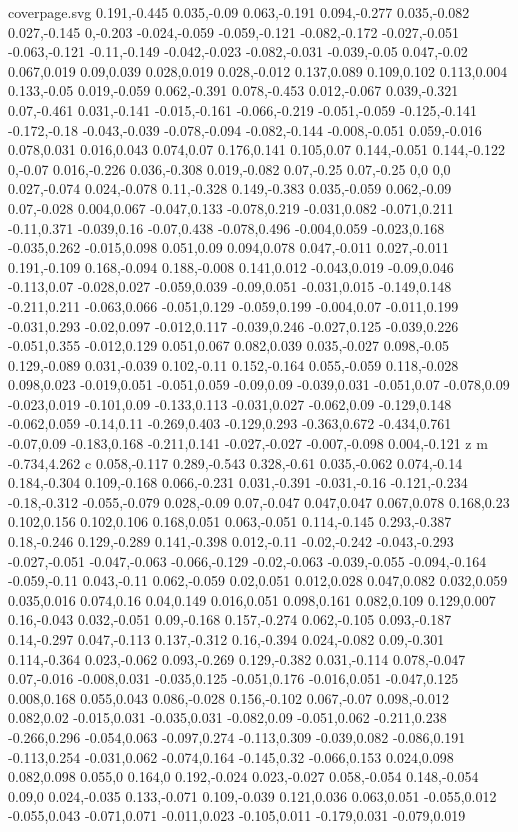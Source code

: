 \begin{filecontents}[noheader]{coverpage.svg}
0.191,-0.445 0.035,-0.09 0.063,-0.191 0.094,-0.277 0.035,-0.082 0.027,-0.145 0,-0.203 -0.024,-0.059 -0.059,-0.121 -0.082,-0.172 -0.027,-0.051 -0.063,-0.121 -0.11,-0.149 -0.042,-0.023 -0.082,-0.031 -0.039,-0.05 0.047,-0.02 0.067,0.019 0.09,0.039 0.028,0.019 0.028,-0.012 0.137,0.089 0.109,0.102 0.113,0.004 0.133,-0.05 0.019,-0.059 0.062,-0.391 0.078,-0.453 0.012,-0.067 0.039,-0.321 0.07,-0.461 0.031,-0.141 -0.015,-0.161 -0.066,-0.219 -0.051,-0.059 -0.125,-0.141 -0.172,-0.18 -0.043,-0.039 -0.078,-0.094 -0.082,-0.144 -0.008,-0.051 0.059,-0.016 0.078,0.031 0.016,0.043 0.074,0.07 0.176,0.141 0.105,0.07 0.144,-0.051 0.144,-0.122 0,-0.07 0.016,-0.226 0.036,-0.308 0.019,-0.082 0.07,-0.25 0.07,-0.25 0,0 0,0 0.027,-0.074 0.024,-0.078 0.11,-0.328 0.149,-0.383 0.035,-0.059 0.062,-0.09 0.07,-0.028 0.004,0.067 -0.047,0.133 -0.078,0.219 -0.031,0.082 -0.071,0.211 -0.11,0.371 -0.039,0.16 -0.07,0.438 -0.078,0.496 -0.004,0.059 -0.023,0.168 -0.035,0.262 -0.015,0.098 0.051,0.09 0.094,0.078 0.047,-0.011 0.027,-0.011 0.191,-0.109 0.168,-0.094 0.188,-0.008 0.141,0.012 -0.043,0.019 -0.09,0.046 -0.113,0.07 -0.028,0.027 -0.059,0.039 -0.09,0.051 -0.031,0.015 -0.149,0.148 -0.211,0.211 -0.063,0.066 -0.051,0.129 -0.059,0.199 -0.004,0.07 -0.011,0.199 -0.031,0.293 -0.02,0.097 -0.012,0.117 -0.039,0.246 -0.027,0.125 -0.039,0.226 -0.051,0.355 -0.012,0.129 0.051,0.067 0.082,0.039 0.035,-0.027 0.098,-0.05 0.129,-0.089 0.031,-0.039 0.102,-0.11 0.152,-0.164 0.055,-0.059 0.118,-0.028 0.098,0.023 -0.019,0.051 -0.051,0.059 -0.09,0.09 -0.039,0.031 -0.051,0.07 -0.078,0.09 -0.023,0.019 -0.101,0.09 -0.133,0.113 -0.031,0.027 -0.062,0.09 -0.129,0.148 -0.062,0.059 -0.14,0.11 -0.269,0.403 -0.129,0.293 -0.363,0.672 -0.434,0.761 -0.07,0.09 -0.183,0.168 -0.211,0.141 -0.027,-0.027 -0.007,-0.098 0.004,-0.121 z m -0.734,4.262 c 0.058,-0.117 0.289,-0.543 0.328,-0.61 0.035,-0.062 0.074,-0.14 0.184,-0.304 0.109,-0.168 0.066,-0.231 0.031,-0.391 -0.031,-0.16 -0.121,-0.234 -0.18,-0.312 -0.055,-0.079 0.028,-0.09 0.07,-0.047 0.047,0.047 0.067,0.078 0.168,0.23 0.102,0.156 0.102,0.106 0.168,0.051 0.063,-0.051 0.114,-0.145 0.293,-0.387 0.18,-0.246 0.129,-0.289 0.141,-0.398 0.012,-0.11 -0.02,-0.242 -0.043,-0.293 -0.027,-0.051 -0.047,-0.063 -0.066,-0.129 -0.02,-0.063 -0.039,-0.055 -0.094,-0.164 -0.059,-0.11 0.043,-0.11 0.062,-0.059 0.02,0.051 0.012,0.028 0.047,0.082 0.032,0.059 0.035,0.016 0.074,0.16 0.04,0.149 0.016,0.051 0.098,0.161 0.082,0.109 0.129,0.007 0.16,-0.043 0.032,-0.051 0.09,-0.168 0.157,-0.274 0.062,-0.105 0.093,-0.187 0.14,-0.297 0.047,-0.113 0.137,-0.312 0.16,-0.394 0.024,-0.082 0.09,-0.301 0.114,-0.364 0.023,-0.062 0.093,-0.269 0.129,-0.382 0.031,-0.114 0.078,-0.047 0.07,-0.016 -0.008,0.031 -0.035,0.125 -0.051,0.176 -0.016,0.051 -0.047,0.125 0.008,0.168 0.055,0.043 0.086,-0.028 0.156,-0.102 0.067,-0.07 0.098,-0.012 0.082,0.02 -0.015,0.031 -0.035,0.031 -0.082,0.09 -0.051,0.062 -0.211,0.238 -0.266,0.296 -0.054,0.063 -0.097,0.274 -0.113,0.309 -0.039,0.082 -0.086,0.191 -0.113,0.254 -0.031,0.062 -0.074,0.164 -0.145,0.32 -0.066,0.153 0.024,0.098 0.082,0.098 0.055,0 0.164,0 0.192,-0.024 0.023,-0.027 0.058,-0.054 0.148,-0.054 0.09,0 0.024,-0.035 0.133,-0.071 0.109,-0.039 0.121,0.036 0.063,0.051 -0.055,0.012 -0.055,0.043 -0.071,0.071 -0.011,0.023 -0.105,0.011 -0.179,0.031 -0.079,0.019 
\end{filecontents}
